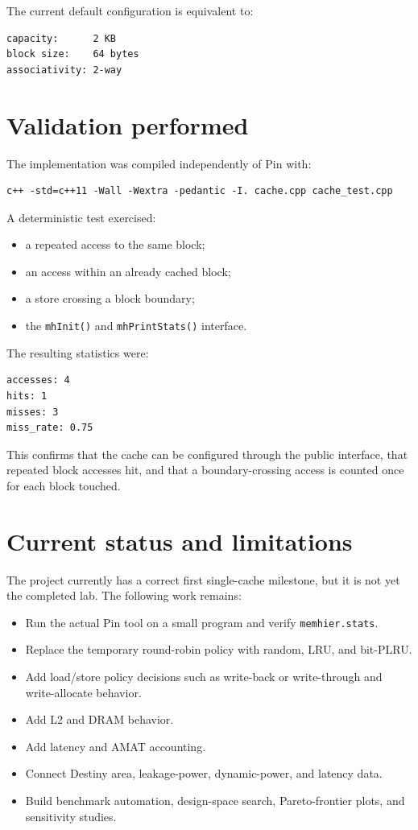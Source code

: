 \documentclass[11pt]{article}
\begin{document}
The current default configuration is equivalent to:
\begin{lstlisting}
capacity:      2 KB
block size:    64 bytes
associativity: 2-way
\end{lstlisting}

\section{Validation performed}

The implementation was compiled independently of Pin with:
\begin{lstlisting}
c++ -std=c++11 -Wall -Wextra -pedantic -I. cache.cpp cache_test.cpp
\end{lstlisting}

A deterministic test exercised:
\begin{itemize}[leftmargin=*]
  \item a repeated access to the same block;
  \item an access within an already cached block;
  \item a store crossing a block boundary;
  \item the \texttt{mhInit()} and \texttt{mhPrintStats()} interface.
\end{itemize}

The resulting statistics were:
\begin{lstlisting}
accesses: 4
hits: 1
misses: 3
miss_rate: 0.75
\end{lstlisting}

This confirms that the cache can be configured through the public interface,
that repeated block accesses hit, and that a boundary-crossing access is
counted once for each block touched.

\section{Current status and limitations}

The project currently has a correct first single-cache milestone, but it is not
yet the completed lab. The following work remains:
\begin{itemize}[leftmargin=*]
  \item Run the actual Pin tool on a small program and verify
        \texttt{memhier.stats}.
  \item Replace the temporary round-robin policy with random, LRU, and bit-PLRU.
  \item Add load/store policy decisions such as write-back or write-through and
        write-allocate behavior.
  \item Add L2 and DRAM behavior.
  \item Add latency and AMAT accounting.
  \item Connect Destiny area, leakage-power, dynamic-power, and latency data.
  \item Build benchmark automation, design-space search, Pareto-frontier plots,
        and sensitivity studies.
\end{itemize}
\end{document}
